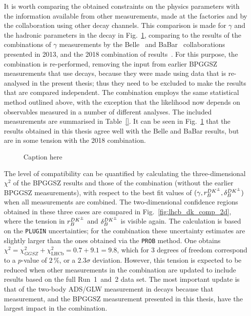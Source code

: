 It is worth comparing the obtained constraints on the physics parameters with the information available from other measurements, made at the \B factories and by the \lhcb collaboration using other decay channels. This comparison is made for $\gamma$ and the hadronic parameters in the \BtoDK decay in Fig.~\ref{fig:all_gamma_results}, comparing to the results of the combinations of $\gamma$ measurements by the Belle~\cite{BelleCombo} and BaBar~\cite{BabarCombo} collaborations presented in 2013, and the 2018 combination of \lhcb results~\cite{LHCb-CONF-2018-002}. For this purpose, the \lhcb combination is re-performed,  removing the input from earlier BPGGSZ measurements that use \BtoDK decays, because they were made using data that is re-analysed in the present thesis; thus they need to be excluded to make the results that are compared independent. The combination employs the same statistical method outlined above, with the exception that the likelihood now depends on observables measured in a number of different analyses. The included measurements are summarised in Table~\ref{}. It can be seen in Fig.~\ref{fig:all_gamma_results} that the results obtained in this thesis agree well with the Belle and BaBar results, but are in some tension with the 2018 \lhcb combination.

\begin{figure}[tb]
    \centering
    \caption{Caption here}
    \label{fig:all_gamma_results}
\end{figure}

The level of compatibility can be quantified by calculating the three-dimensional $\chi^2$ of the BPGGSZ results and those of the \lhcb combination (without the earlier BPGGSZ measurements), with respect to the best fit values of $(\gamma, r_B^{{{D}{{K}^\pm}}}, \delta_B^{{{D}{{K}^\pm}}})$ when all measurements are combined. The two-dimensional confidence regions obtained in these three cases are compared in Fig.~\ref{fig:lhcb_dk_comp_2d}, where the tension in $r_B^{{{D}{{K}^\pm}}}$ and $\delta_B^{{{D}{{K}^\pm}}}$ is visible again. The calculation is based on the \texttt{PLUGIN} uncertainties; for the \lhcb combination these uncertainty estimates are slightly larger than the ones obtained via the \texttt{PROB} method. One obtains $\chi^2=\chi^2_{GGSZ}+\chi^2_\text{LHCb} = 0.7 + 9.1 = 9.8$, which for 3 degrees of freedom correspond to a $p$-value of $2\,\%$, or a $2.3\sigma$ deviation. However, this tension is expected to be reduced when other measurements in the \lhcb combination are updated to include results based on the full Run~1~and~2 data set. The most important update is that of the two-body ADS/GLW measurement in \BtoDK decays because that measurement, and the BPGGSZ measurement presented in this thesis, have the largest impact in the combination.


